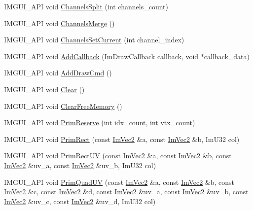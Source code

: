 \begin{DoxyCompactItemize}
\item 
I\+M\+G\+U\+I\+\_\+\+A\+PI void \hyperlink{struct_im_draw_list_a426f124ba049bed2d38c850c65f9f917}{Channels\+Split} (int channels\+\_\+count)
\item 
I\+M\+G\+U\+I\+\_\+\+A\+PI void \hyperlink{struct_im_draw_list_a2ed82c3f663cda520c90c55b94196274}{Channels\+Merge} ()
\item 
I\+M\+G\+U\+I\+\_\+\+A\+PI void \hyperlink{struct_im_draw_list_a7de44b9fdfce65f32063ecad9306a191}{Channels\+Set\+Current} (int channel\+\_\+index)
\item 
I\+M\+G\+U\+I\+\_\+\+A\+PI void \hyperlink{struct_im_draw_list_a14073d60ef9db9dc663dc7717a4893a5}{Add\+Callback} (Im\+Draw\+Callback callback, void $\ast$callback\+\_\+data)
\item 
I\+M\+G\+U\+I\+\_\+\+A\+PI void \hyperlink{struct_im_draw_list_a846714bb0321c6f1f908767abc8559e6}{Add\+Draw\+Cmd} ()
\item 
I\+M\+G\+U\+I\+\_\+\+A\+PI void \hyperlink{struct_im_draw_list_ac422590c71dc5593aea52f65793aee81}{Clear} ()
\item 
I\+M\+G\+U\+I\+\_\+\+A\+PI void \hyperlink{struct_im_draw_list_a8b2686e006f57c554b709dfc47e2ad63}{Clear\+Free\+Memory} ()
\item 
I\+M\+G\+U\+I\+\_\+\+A\+PI void \hyperlink{struct_im_draw_list_a879aa38dbfb0344e3e023d65c002c7d7}{Prim\+Reserve} (int idx\+\_\+count, int vtx\+\_\+count)
\item 
I\+M\+G\+U\+I\+\_\+\+A\+PI void \hyperlink{struct_im_draw_list_ae2be093563f1d20b8190b7c423113925}{Prim\+Rect} (const \hyperlink{struct_im_vec2}{Im\+Vec2} \&a, const \hyperlink{struct_im_vec2}{Im\+Vec2} \&b, Im\+U32 col)
\item 
I\+M\+G\+U\+I\+\_\+\+A\+PI void \hyperlink{struct_im_draw_list_a77d48ed5b33ccdd908824c0a3bebfff8}{Prim\+Rect\+UV} (const \hyperlink{struct_im_vec2}{Im\+Vec2} \&a, const \hyperlink{struct_im_vec2}{Im\+Vec2} \&b, const \hyperlink{struct_im_vec2}{Im\+Vec2} \&uv\+\_\+a, const \hyperlink{struct_im_vec2}{Im\+Vec2} \&uv\+\_\+b, Im\+U32 col)
\item 
I\+M\+G\+U\+I\+\_\+\+A\+PI void \hyperlink{struct_im_draw_list_a9df27414aaca5f34ac3664a8b82582b5}{Prim\+Quad\+UV} (const \hyperlink{struct_im_vec2}{Im\+Vec2} \&a, const \hyperlink{struct_im_vec2}{Im\+Vec2} \&b, const \hyperlink{struct_im_vec2}{Im\+Vec2} \&c, const \hyperlink{struct_im_vec2}{Im\+Vec2} \&d, const \hyperlink{struct_im_vec2}{Im\+Vec2} \&uv\+\_\+a, const \hyperlink{struct_im_vec2}{Im\+Vec2} \&uv\+\_\+b, const \hyperlink{struct_im_vec2}{Im\+Vec2} \&uv\+\_\+c, const \hyperlink{struct_im_vec2}{Im\+Vec2} \&uv\+\_\+d, Im\+U32 col)

\end{DoxyCompactItemize}

